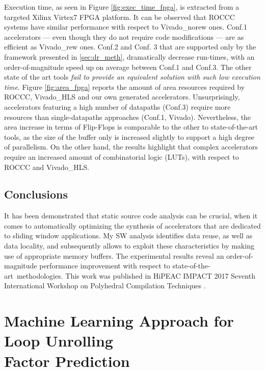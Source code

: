 \documentclass[]{usiinfthesis}
\newcommand{\SoTA}{{state-of-the-art}}
\begin{document}
Execution time, as seen in Figure \ref{fig:exec_time_fpga}, is extracted from 
a targeted Xilinx Virtex7 FPGA platform. 
It can be observed that ROCCC systems have similar
performance with respect to Vivado\_norew ones. Conf.1 accelerators 
--- even though they do not require code modifications --- are as 
efficient as Vivado\_rew ones. Conf.2 and Conf. 3 that are
supported only by the framework presented in \ref{sec:dr_meth}, dramatically decrease
run-times, with an order-of-magnitude speed up on average between
Conf.1 and Conf.3. The other state of the art tools \emph{fail to 
provide an equivalent solution with such low execution time}.
Figure \ref{fig:area_fpga} reports the amount of area resources required by
ROCCC, Vivado\_HLS and our own generated accelerators.
Unsurprisingly, accelerators featuring a high number of datapaths (Conf.3) 
require more resources than single-datapaths approaches (Conf.1, Vivado). 
Nevertheless, the area increase in terms of Flip-Flops is comparable to 
the other to state-of-the-art tools, as the size of the buffer only is 
increased slightly to support a high degree of parallelism.
On the other hand, the results highlight that complex accelerators require 
an increased amount of combinatorial logic (LUTs), with respect to ROCCC 
and Vivado\_HLS.

\vspace{-0.3cm}
\subsection{Conclusions}

It has been demonstrated that static source code analysis can be crucial, when it comes to 
automatically optimizing the synthesis of accelerators that are dedicated to 
sliding window applications. My SW analysis identifies data reuse, as well as data locality,
and subsequently allows to exploit these characteristics by making use of appropriate
memory buffers. The experimental results reveal an order-of-magnitude performance 
improvement with respect to \SoTA\ methodologies. This work was published in 
HiPEAC IMPACT 2017 Seventh International Workshop on Polyhedral Compilation Techniques 
\cite{ZacharopoulosJan17}. 

%

\section[Machine Learning Approach for Loop Unrolling\\ Factor Prediction]
{Machine Learning Approach for Loop Unrolling\\ Factor Prediction}
\end{document}
